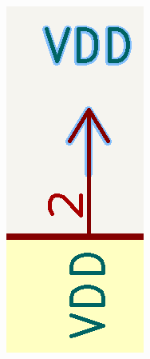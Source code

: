 \documentclass[12pt]{book}
\begin{document}
	\begin{figure}[!ht]
		\centering
		\begin{subfigure}[t]{0.1\textwidth}
			\includegraphics[width=\textwidth]{images/sch/sch_vdd}

\end{subfigure}
\end{figure}
\end{document}
